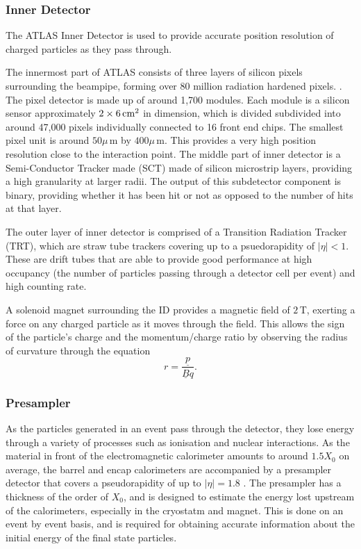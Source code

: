\documentclass{article}
\begin{document}
\subsubsection{Inner Detector}
\label{sec:ATLAS_DetectorSchematics_ID}
The ATLAS Inner Detector is used to provide accurate position resolution of charged particles as they pass through. 

The innermost part of ATLAS consists of three layers of silicon pixels surrounding the beampipe, forming over 80 million radiation hardened pixels. \cite{ATLASPixelDetector}. The pixel detector is made up of around 1,700 modules. Each module is a silicon sensor approximately $2\times6\,\rm{cm}^2$ in dimension, which is divided subdivided into around 47,000 pixels individually connected to 16 front end chips. The smallest pixel unit is around $50\mu\,$m by $400\mu\,$m. This provides a very high position resolution close to the interaction point. 
The middle part of inner detector is a Semi-Conductor Tracker made (SCT) made of silicon microstrip layers\cite{ATLASReview},  providing a high granularity at larger radii. The output of this subdetector component is binary, providing whether it has been hit or not as opposed to the number of hits at that layer.

The outer layer of inner detector is comprised of a Transition Radiation Tracker (TRT), which are straw tube trackers covering up to a psuedorapidity of $|\eta|<1$. These are drift tubes that are able to provide good performance at high occupancy (the number of particles passing through a detector cell per event) and high counting rate. 

A solenoid magnet surrounding the ID provides a magnetic field of $2\,$T, exerting a force on any charged particle as it moves through the field. This allows the sign of the particle's charge and the momentum/charge ratio by observing the radius of curvature through the equation 
\begin{equation} 
r = \frac{\underline{p}}{\underline{B}q}. 
\end{equation}

\subsubsection{Presampler}
\label{sec:ATLAS_DetectorSchematics_Presampler}

As the particles generated in an event pass through the detector, they lose energy through a variety of processes such as ionisation and nuclear interactions.
As the material in front of the electromagnetic calorimeter amounts to around $1.5X_0$ on average, the barrel and encap calorimeters are accompanied by a presampler detector that covers a pseudorapidity of up to $|\eta| = 1.8$ \cite{EMCParticleIdentification}. The presampler has a thickness of the order of $X_0$, and is designed to estimate the energy lost upstream of the calorimeters, especially in the cryostatm and magnet. This is done on an event by event basis, and is required for obtaining accurate information about the initial energy of the final state particles.
\end{document}
